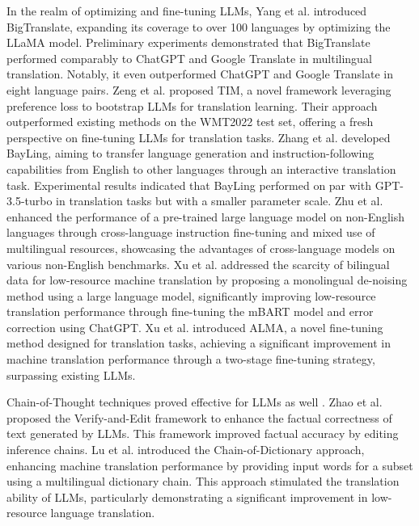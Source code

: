 \documentclass[acmsmall]{acmart}
\begin{document}
In the realm of optimizing and fine-tuning LLMs, Yang et al. \cite{yang2023bigtranslate} introduced BigTranslate, expanding its coverage to over 100 languages by optimizing the LLaMA model. Preliminary experiments demonstrated that BigTranslate performed comparably to ChatGPT and Google Translate in multilingual translation. Notably, it even outperformed ChatGPT and Google Translate in eight language pairs. Zeng et al. \cite{DBLP:journals/corr/abs-2307-04408} proposed TIM, a 
novel framework leveraging preference loss to bootstrap LLMs for translation learning. Their approach outperformed existing methods on the WMT2022 test set, offering a fresh perspective on fine-tuning LLMs for translation tasks. Zhang et al. \cite{DBLP:journals/corr/abs-2306-10968} developed BayLing, aiming to transfer language generation and instruction-following capabilities from English to other languages through an interactive translation task. Experimental results indicated that BayLing performed on par with GPT-3.5-turbo in translation tasks but with a smaller parameter scale. Zhu et al. \cite{DBLP:journals/corr/abs-2308-04948} enhanced the performance of a pre-trained large language model on non-English languages through cross-language instruction fine-tuning and mixed use of multilingual resources, showcasing the advantages of cross-language models on various non-English benchmarks. Xu et al. \cite{DBLP:conf/nlpcc/XuWXH23} addressed the scarcity of bilingual data for low-resource machine translation by proposing a monolingual de-noising method using a large language model, significantly improving low-resource translation performance through fine-tuning the mBART model and error correction using ChatGPT. Xu et al. \cite{DBLP:journals/corr/abs-2309-11674} introduced ALMA, a novel fine-tuning method designed for translation tasks, achieving a significant improvement in machine translation performance through a two-stage fine-tuning strategy, surpassing existing LLMs.

Chain-of-Thought techniques proved effective for LLMs as well \cite{DBLP:conf/nips/Wei0SBIXCLZ22}. Zhao et al. \cite{DBLP:conf/acl/ZhaoLJQB23} proposed the Verify-and-Edit framework to enhance the factual correctness of text generated by LLMs. This framework improved factual accuracy by editing inference chains. Lu et al. \cite{DBLP:journals/corr/abs-2305-06575} introduced the Chain-of-Dictionary approach, enhancing machine translation performance by providing input words for a subset using a multilingual dictionary chain. This approach stimulated the translation ability of LLMs, particularly demonstrating a significant improvement in low-resource language translation.
\end{document}
